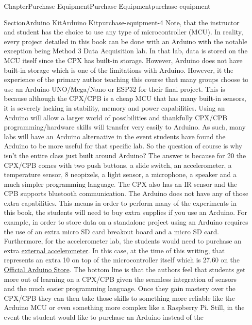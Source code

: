\documentclass[oneside,10pt,]{book}
\newcommand{\linkhilite}[1]{\underline{#1}}
\numberwithin{equation}{section}
\begin{document}
\begin{chapterptx}{Chapter}{Purchase Equipment}{}{Purchase Equipment}{}{}{purchase-equipment}
\begin{sectionptx}{Section}{Arduino Kit}{}{Arduino Kit}{}{}{purchase-equipment-4}
Note, that the instructor and student has the choice to use any type of microcontroller (MCU). In reality, every project detailed in this book can be done with an Arduino with the notable exception being Method 3 Data Acquisition lab. In that lab, data is stored on the MCU itself since the CPX has built-in storage. However, Arduino does not have built-in storage which is one of the limitations with Arduino. However, it the experience of the primary author teaching this course that many groups choose to use an Arduino UNO\slash{}Mega\slash{}Nano or ESP32 for their final project. This is because although the CPX\slash{}CPB is a cheap MCU that has many built-in sensors, it is severely lacking in stability, memory and power capabilities. Using an Arduino will allow a larger world of possibilities and thankfully CPX\slash{}CPB programming\slash{}hardware skills will transfer very easily to Arduino. As such, many labs will have an Arduino alternative in the event students have found the Arduino to be more useful for that specific lab. So the question of course is why isn’t the entire class just built around Arduino? The answer is because for \textdollar{}20 the CPX\slash{}CPB comes with two push buttons, a slide switch, an accelerometer, a temperature sensor, 8 neopixels, a light sensor, a microphone, a speaker and a much simpler programming language. The CPX also has an IR sensor and the CPB supports bluetooth communication. The Arduino does not have any of those extra capabilities. This means in order to perform many of the experiments in this book, the students will need to buy extra supplies if you use an Arduino. For example, in order to store data on a standalone project using an Arduino requires the use of an extra micro SD card breakout board and a \href{https://www.adafruit.com/product/4682?gad_source=1\&gad_campaignid=23438252138\&gbraid=0AAAAADx9JvSwU8AgEo6zbpyqSObyRYEag\&gclid=CjwKCAjwwpDQBhAuEiwAa-4Wo0MRxAOx4gdkI3ZPRh7lYKrN5u-dFIkiIfKsLBkJC6I18aCrNlCvEBoC0rgQAvD_BwE}{\linkhilite{micro SD card}}. Furthermore, for the accelerometer lab, the students would need to purchase an extra \href{https://www.adafruit.com/product/2019}{\linkhilite{external accelerometer}}. In this case, at the time of this writing, that represents an extra \textdollar{}10 on top of the microcontroller itself which is \textdollar{}27.60 on the \href{https://store-usa.arduino.cc/products/arduino-uno-rev3?utm_source=google\&utm_medium=cpc\&utm_campaign=US-Pmax\&gad_source=1\&gad_campaignid=21317508903\&gbraid=0AAAAACbEa86LJ3YDsL-3aDjMOhB_LzEaL\&gclid=CjwKCAjwwpDQBhAuEiwAa-4Wo3mpltsHJoDltwWD1lLRXMur3mj01diTFH-Fb50kmQlrHxQXUywfVRoCLKsQAvD_BwE}{\linkhilite{Official Arduino Store}}. The bottom line is that the authors feel that students get more out of learning on a CPX\slash{}CPB given the seamless integration of sensors and the much easier programming language. Once they gain mastery over the CPX\slash{}CPB they can then take those skills to something more reliable like the Arduino MCU or even something more complex like a Raspberry Pi. Still, in the event the student would like to purchase an Arduino instead of the 
\end{sectionptx}
\end{chapterptx}
\end{document}
